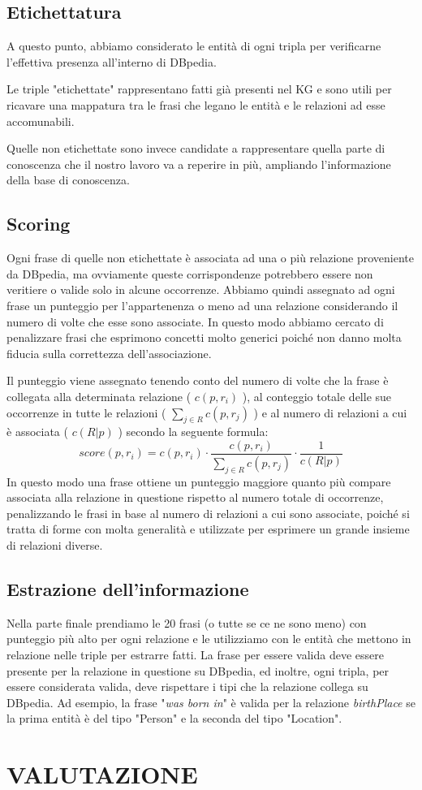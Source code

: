 \documentclass[10pt,a4paper,twocolumn]{article}
\begin{document}
\subsection{Etichettatura}
A questo punto, abbiamo considerato le entità di ogni tripla per verificarne l'effettiva presenza all'interno di DBpedia.

Le triple "etichettate" rappresentano fatti già presenti nel KG e sono utili per ricavare una mappatura tra le frasi che legano le entità e le relazioni ad esse accomunabili.

Quelle non etichettate sono invece candidate a rappresentare quella parte di conoscenza che il nostro lavoro va a reperire in più, ampliando l'informazione della base di conoscenza.

\subsection{Scoring}

Ogni frase di quelle non etichettate è associata ad una o più relazione proveniente da DBpedia, ma ovviamente queste corrispondenze potrebbero essere non veritiere o valide solo in alcune occorrenze. Abbiamo quindi assegnato ad ogni frase un punteggio per l'appartenenza o meno ad una relazione considerando il numero di volte che esse sono associate. In questo modo abbiamo cercato di penalizzare frasi che esprimono concetti molto generici poiché non danno molta fiducia sulla correttezza dell'associazione.

Il punteggio viene assegnato tenendo conto del numero di volte che la frase è collegata alla determinata relazione ( $c(p,r_i)$ ), al conteggio totale delle sue occorrenze in tutte le relazioni ( $\sum_{j \in R} c(p,r_j)$ ) e al numero di relazioni a cui è associata ( $c(R|p)$ ) secondo la seguente formula:
\[score(p,r_i)=c(p,r_i)\cdot\frac{c(p,r_i)}{\sum_{j \in R}c(p,r_j)}\cdot \frac{1}{c(R|p)} \]
In questo modo una frase ottiene un punteggio maggiore quanto più compare associata alla relazione in questione rispetto al numero totale di occorrenze, penalizzando le frasi in base al numero di relazioni a cui sono associate, poiché si tratta di forme con molta generalità e utilizzate per esprimere un grande insieme di relazioni diverse. 

\subsection{Estrazione dell'informazione}

Nella parte finale prendiamo le 20 frasi (o tutte se ce ne sono meno) con punteggio più alto per ogni relazione e le utilizziamo con le entità che mettono in relazione nelle triple per estrarre fatti. La frase per essere valida deve essere presente per la relazione in questione su DBpedia, ed inoltre, ogni tripla, per essere considerata valida, deve rispettare i tipi che la relazione collega su DBpedia. Ad esempio, la frase "\textit{was born in}" è valida per la relazione \textit{birthPlace} se la prima entità è del tipo "Person" e la seconda del tipo "Location".

\section{VALUTAZIONE}
\end{document}
